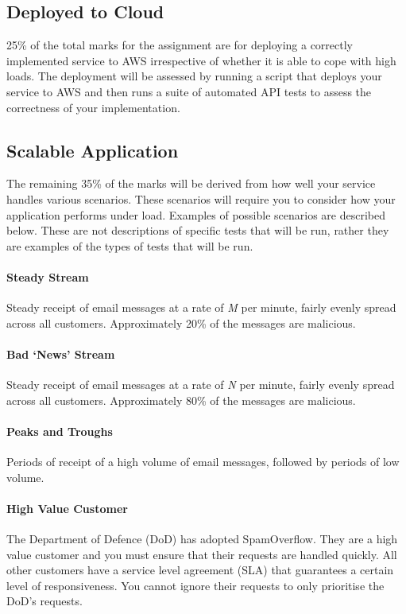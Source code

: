 \documentclass{csse4400}
\begin{document}
\subsection{Deployed to Cloud} %
25\% of the total marks for the assignment are for deploying a correctly implemented service to AWS irrespective of whether it is able to cope with high loads.
The deployment will be assessed by running a script that deploys your service to AWS and then runs a suite of automated API tests to assess the correctness of your implementation.

\subsection{Scalable Application}\label{sec:scenarios} %
The remaining 35\% of the marks will be derived from how well your service handles various scenarios.
These scenarios will require you to consider how your application performs under load.
Examples of possible scenarios are described below.
These are not descriptions of specific tests that will be run, rather they are examples of the types of tests that will be run.

\paragraph{Steady Stream}
Steady receipt of email messages at a rate of \emph{M} per minute, fairly evenly spread across all customers.
Approximately 20\% of the messages are malicious.

\paragraph{Bad `News' Stream}
Steady receipt of email messages at a rate of \emph{N} per minute, fairly evenly spread across all customers.
Approximately 80\% of the messages are malicious.

\paragraph{Peaks and Troughs}
Periods of receipt of a high volume of email messages, followed by periods of low volume.

\paragraph{High Value Customer}
The Department of Defence (DoD) has adopted SpamOverflow.
They are a high value customer and you must ensure that their requests are handled quickly.
All other customers have a service level agreement (SLA) that guarantees a certain level of responsiveness.
You cannot ignore their requests to only prioritise the DoD's requests.
\end{document}
